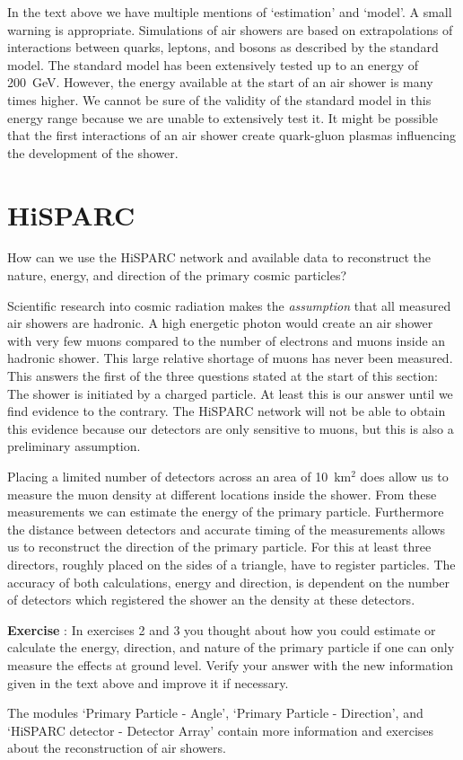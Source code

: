 \documentclass[12pt,a4paper]{article}
\numberwithin{equation}{section}
\numberwithin{figure}{section}
\newcounter{Exercise}
\numberwithin{table}{section}
\begin{document}
In the text above we have multiple mentions of `estimation' and `model'. A small warning is appropriate. Simulations of air showers are based on extrapolations of interactions between quarks, leptons, and bosons as described by the standard model. The standard model has been extensively tested up to an energy of 200~GeV. However, the energy available at the start of an air shower is many times higher. We cannot be sure of the validity of the standard model in this energy range because we are unable to extensively test it. It might be possible that the first interactions of an air shower create quark-gluon plasmas influencing the development of the shower.

\section{HiSPARC}
How can we use the HiSPARC network and available data to reconstruct the nature, energy, and direction of the primary cosmic particles?

Scientific research into cosmic radiation makes the \emph{assumption} that all measured air showers are hadronic. A high energetic photon would create an air shower with very few muons compared to the number of electrons and muons inside an hadronic shower. This large relative shortage of muons has never been measured. This answers the first of the three questions stated at the start of this section: The shower is initiated by a charged particle. At least this is our answer until we find evidence to the contrary. The HiSPARC network will not be able to obtain this evidence because our detectors are only sensitive to muons, but this is also a preliminary assumption.

Placing a limited number of detectors across an area of 10~km$^2$ does allow us to measure the muon density at different locations inside the shower. From these measurements we can estimate the energy of the primary particle. Furthermore the distance between detectors and accurate timing of the measurements allows us to reconstruct the direction of the primary particle. For this at least three directors, roughly placed on the sides of a triangle, have to register particles. The accuracy of both calculations, energy and direction, is dependent on the number of detectors which registered the shower an the density at these detectors.

\begin{shaded}
\textbf{Exercise \theExercise {}} : In exercises 2 and 3 you thought about how you could estimate or calculate the energy, direction, and nature of the primary particle if one can only measure the effects at ground level. Verify your answer with the new information given in the text above and improve it if necessary.\end{shaded}

The modules `Primary Particle - Angle', `Primary Particle - Direction', and `HiSPARC detector - Detector Array' contain more information and exercises about the reconstruction of air showers.
\end{document}
